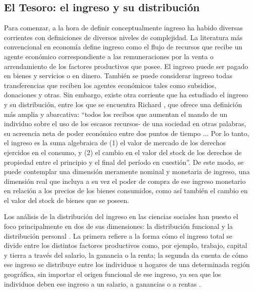 	\subsection{El Tesoro: el ingreso y su distribución}
Para comenzar, a la hora de definir conceptualmente ingreso ha habido diversas corrientes con definiciones de diversos niveles de complejidad. La literatura más convencional en economía define ingreso como el flujo de recursos que recibe un agente económico correspondiente a las remuneraciones por la venta o arrendamiento de los factores productivos que posee. El ingreso puede ser pagado en bienes y servicios o en dinero. También se puede considerar ingreso todas transferencias que reciben los agentes económicos tales como subsidios, donaciones y otras. Sin embargo, existe otra corriente que ha estudiado el ingreso y su distribución, entre los que se encuentra Richard , que ofrece una definición más amplia y abarcativa: “todos los recibos que aumentan el mando de un individuo sobre el uso de los escasos recursos- de una sociedad en otras palabras, su acreencia neta de poder económico entre dos puntos de tiempo ... Por lo tanto, el ingreso es la suma algebraica de (1) el valor de mercado de los derechos ejercidos en el consumo, y (2) el cambio en el valor del stock de los derechos de propiedad entre el principio y el final del período en cuestión”. De este modo, se puede contemplar una dimensión meramente nominal y monetaria de ingreso, una dimensión real que incluya a su vez el poder de compra de ese ingreso monetario en relación a los precios de los bienes consumidos, como así también el cambio en el valor del stock de bienes que se poseen.

Los análisis de la distribución del ingreso en las ciencias sociales han puesto el foco principalmente en dos de sus dimensiones: la distribución funcional y la distribución personal \cite{bemis}. La primera refiere a la forma cómo el ingreso total se divide entre los distintos factores productivos como, por ejemplo, trabajo, capital y tierra a través del salario, la ganancia o la renta; la segunda da cuenta de cómo ese ingreso se distribuye entre los individuos u hogares de una determinada región geográfica, sin importar el origen funcional de ese ingreso, ya sea que los individuos deben ese ingreso a un salario, a ganancias o a rentas \cite{gasparini2001}. 

